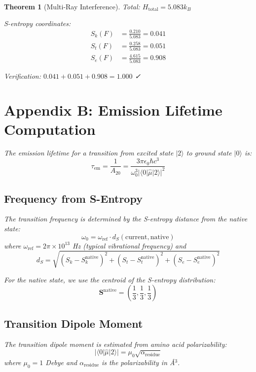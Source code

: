 \documentclass[11pt,a4paper]{article}
\newtheorem{theorem}{Theorem}[section]
\begin{document}
\begin{theorem}[Multi-Ray Interference]
Total: $H_{\text{total}} = 5.083 k_B$

S-entropy coordinates:
\begin{align}
S_k(F) &= \frac{0.210}{5.083} = 0.041 \\
S_t(F) &= \frac{0.258}{5.083} = 0.051 \\
S_e(F) &= \frac{4.615}{5.083} = 0.908
\end{align}

Verification: $0.041 + 0.051 + 0.908 = 1.000$ ✓

\section{Appendix B: Emission Lifetime Computation}

The emission lifetime for a transition from excited state $|2\rangle$ to ground state $|0\rangle$ is:
\begin{equation}
\tau_{\text{em}} = \frac{1}{A_{20}} = \frac{3\pi\epsilon_0\hbar c^3}{\omega_0^3 |\langle 0|\hat{\mu}|2\rangle|^2}
\end{equation}

\subsection{Frequency from S-Entropy}

The transition frequency is determined by the S-entropy distance from the native state:
\begin{equation}
\omega_0 = \omega_{\text{ref}} \cdot d_S(\text{current}, \text{native})
\end{equation}
where $\omega_{\text{ref}} = 2\pi \times 10^{13}$ Hz (typical vibrational frequency) and
\begin{equation}
d_S = \sqrt{(S_k - S_k^{\text{native}})^2 + (S_t - S_t^{\text{native}})^2 + (S_e - S_e^{\text{native}})^2}
\end{equation}

For the native state, we use the centroid of the S-entropy distribution:
\begin{equation}
\mathbf{S}^{\text{native}} = \left(\frac{1}{3}, \frac{1}{3}, \frac{1}{3}\right)
\end{equation}

\subsection{Transition Dipole Moment}

The transition dipole moment is estimated from amino acid polarizability:
\begin{equation}
|\langle 0|\hat{\mu}|2\rangle| = \mu_0 \sqrt{\alpha_{\text{residue}}}
\end{equation}
where $\mu_0 = 1$ Debye and $\alpha_{\text{residue}}$ is the polarizability in \AA$^3$.


\end{theorem}
\end{document}
